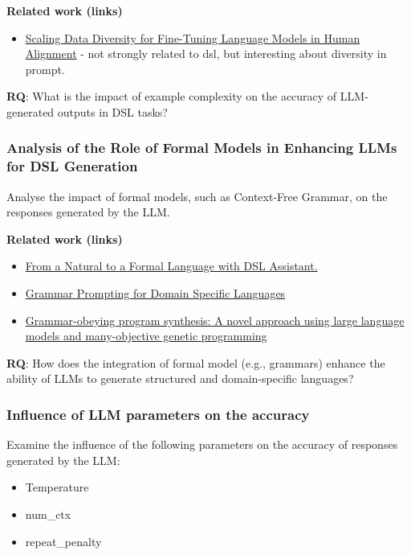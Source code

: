 \textbf{Related work (links)}
\begin{itemize}
    \item \href{http://www.lrec-conf.org/proceedings/lrec-coling-2024/pdf/2024.main-1.1251.pdf}{Scaling Data Diversity for Fine-Tuning Language Models in Human Alignment} - not strongly related to dsl, but interesting about diversity in prompt.
\end{itemize}

\textbf{RQ}: What is the impact of example complexity on the accuracy of LLM-generated outputs in DSL tasks?

\subsubsection{Analysis of the Role of Formal Models in Enhancing LLMs for DSL Generation}

Analyse the impact of formal models, such as Context-Free Grammar, on the responses generated by the LLM.

\textbf{Related work (links)}
\begin{itemize}
    \item \href{https://dl.acm.org/doi/10.1145/3652620.3687811}{From a Natural to a Formal Language with DSL Assistant.}
    \item \href{https://proceedings.neurips.cc/paper_files/paper/2023/file/cd40d0d65bfebb894ccc9ea822b47fa8-Paper-Conference.pdf}{Grammar Prompting for Domain Specific Languages}
    \item \href{https://www.sciencedirect.com/science/article/abs/pii/S0920548924001077}{Grammar-obeying program synthesis: A novel approach using large language models and many-objective genetic programming}
\end{itemize}

\textbf{RQ}: How does the integration of formal model (e.g., grammars) enhance the ability of LLMs to generate structured and domain-specific languages?

\subsubsection{Influence of LLM parameters on the accuracy}
Examine the influence of the following parameters on the accuracy of responses generated by the LLM:

\begin{itemize}
    \item Temperature
    \item num\_ctx
    \item repeat\_penalty
\end{itemize}


